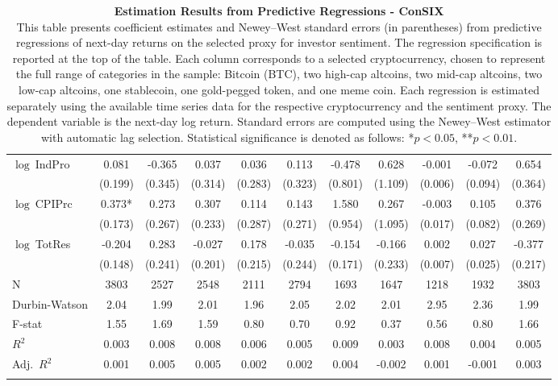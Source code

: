\begin{table}[ht]
\begin{tabular}{l *{10}{c}}
\addlinespace
$\log\ $IndPro & 0.081 & -0.365 & 0.037 & 0.036 & 0.113 & -0.478 & 0.628 & -0.001 & -0.072 & 0.654 \\
 & (0.199) & (0.345) & (0.314) & (0.283) & (0.323) & (0.801) & (1.109) & (0.006) & (0.094) & (0.364) \\
\addlinespace
$\log\ $CPIPrc & 0.373* & 0.273 & 0.307 & 0.114 & 0.143 & 1.580 & 0.267 & -0.003 & 0.105 & 0.376 \\
 & (0.173) & (0.267) & (0.233) & (0.287) & (0.271) & (0.954) & (1.095) & (0.017) & (0.082) & (0.269) \\
\addlinespace
$\log\ $TotRes & -0.204 & 0.283 & -0.027 & 0.178 & -0.035 & -0.154 & -0.166 & 0.002 & 0.027 & -0.377 \\
 & (0.148) & (0.241) & (0.201) & (0.215) & (0.244) & (0.171) & (0.233) & (0.007) & (0.025) & (0.217) \\
\addlinespace
\midrule
N & 3803 & 2527 & 2548 & 2111 & 2794 & 1693 & 1647 & 1218 & 1932 & 3803 \\
Durbin-Watson & 2.04 & 1.99 & 2.01 & 1.96 & 2.05 & 2.02 & 2.01 & 2.95 & 2.36 & 1.99 \\
F-stat & 1.55 & 1.69 & 1.59 & 0.80 & 0.70 & 0.92 & 0.37 & 0.56 & 0.80 & 1.66 \\
\(R^2\) & 0.003 & 0.008 & 0.008 & 0.006 & 0.005 & 0.009 & 0.003 & 0.008 & 0.004 & 0.005 \\
Adj.\ \(R^2\) & 0.001 & 0.005 & 0.005 & 0.002 & 0.002 & 0.004 & -0.002 & 0.001 & -0.001 & 0.003 \\
\addlinespace
\midrule
\multicolumn{11}{c}{Specification tested: $R_{i,t+1} = \alpha_i + \beta_{sent} S_t + \phi R_{i,t} + \theta B_{i,t} + \gamma M_t + \varepsilon_{i,t+1}$}\\
\bottomrule
\end{tabular}
\caption{\textbf{Estimation Results from Predictive Regressions - ConSIX} \\
This table presents coefficient estimates and Newey--West standard errors (in parentheses) from predictive regressions of next-day returns on the selected proxy for investor sentiment. The regression specification is reported at the top of the table. Each column corresponds to a selected cryptocurrency, chosen to represent the full range of categories in the sample: Bitcoin (BTC), two high-cap altcoins, two mid-cap altcoins, two low-cap altcoins, one stablecoin, one gold-pegged token, and one meme coin. Each regression is estimated separately using the available time series data for the respective cryptocurrency and the sentiment proxy. The dependent variable is the next-day log return. Standard errors are computed using the Newey--West estimator with automatic lag selection. Statistical significance is denoted as follows: *$p<0.05$, **$p<0.01$.}
\label{tab:consix_result_h1}
\end{table}